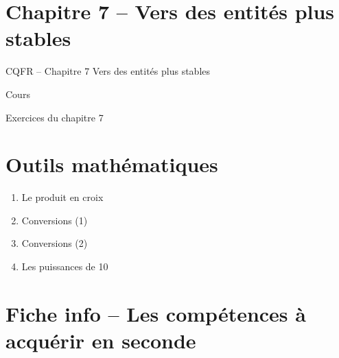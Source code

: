 \documentclass[12pt,a4paper]{article}
\begin{document}
\section*{Chapitre 7 -- Vers des entités plus stables}

\begin{enumerate}
{\color{gray_c}\item CQFR -- Chapitre 7 Vers des entités plus stables}
{\color{gray_c}\item Cours}
\item Exercices du chapitre 7
\end{enumerate}

\section*{Outils mathématiques}

\begin{enumerate}
\item Le produit en croix
\item Conversions (1)
\item Conversions (2)
\item Les puissances de 10
\end{enumerate}

\section*{Fiche info -- Les compétences à acquérir en seconde}
\end{document}
